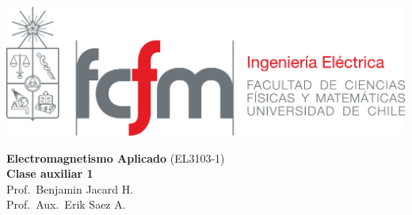 \documentclass[
  11pt,
  letterpaper,
   addpoints,
   answers
  ]{exam}
\begin{document}
\noindent
\begin{minipage}{0.47\textwidth}
\includegraphics[width=\textwidth]{../fcfm_die}
\end{minipage}
\begin{minipage}{0.53\textwidth}
\begin{center} 
\large\textbf{Electromagnetismo Aplicado} (EL3103-1) \\
\large\textbf{Clase auxiliar 1} \\
\normalsize Prof.~Benjamin Jacard H.\\
\normalsize Prof.~Aux.~Erik Saez A.
\end{center}
\end{minipage}

\vspace{0.5cm}
\noindent
\vspace{.85cm}
\end{document}
